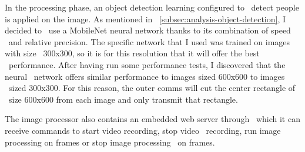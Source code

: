 In the processing phase, an object detection learning configured to \
detect people is applied on the image.
As mentioned in ~\ref{subsec:analysis-object-detection}, I decided to \
use a MobileNet neural network thanks to its combination of speed \
and relative precision.
The specific network that I used was trained on images with size \
300x300, so it is for this resolution that it will offer the best \
performance.
After having run some performance tests, I discovered that the neural \
network offers similar performance to images sized 600x600 to images \
sized 300x300.
For this reason, the outer comms will cut the center rectangle of \
size 600x600 from each image and only transmit that rectangle. %


 The image processor also contains an embedded web server through \
which it can receive commands to start video recording, stop video \
recording, run image processing on frames or stop image processing \
on frames.






%
%
